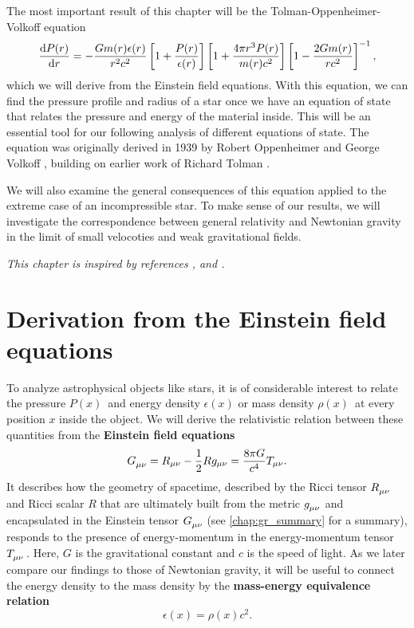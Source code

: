 The most important result of this chapter will be the Tolman-Oppenheimer-Volkoff equation
\begin{equation*}
	\odv{P(r)}{r} = -\frac{G m(r) \epsilon(r)}{r^2 c^2} \left[ 1 + \frac{P(r)}{\epsilon(r)} \right] \left[ 1 + \frac{4 \pi r^3 P(r)}{m(r) c^2} \right] \left[ 1 - \frac{2 G m(r)}{r c^2} \right]^{-1} ,
\end{equation*}
which we will derive from the Einstein field equations.
With this equation, we can find the pressure profile and radius of a star once we have an equation of state that relates the pressure and energy of the material inside.
This will be an essential tool for our following analysis of different equations of state.
The equation was originally derived in 1939 by Robert Oppenheimer and George Volkoff \cite{ref:tov}, building on earlier work of Richard Tolman \cite{ref:tolman}.

We will also examine the general consequences of this equation applied to the extreme case of an incompressible star. 
To make sense of our results, we will investigate the correspondence between general relativity and Newtonian gravity in the limit of small velocoties and weak gravitational fields.

\textit{This chapter is inspired by references \cite{ref:carroll}, \cite{ref:mtw} and \cite{ref:mika_gr_notes}.}

\section{Derivation from the Einstein field equations}
\label{sec:einstein_to_tov}

To analyze astrophysical objects like stars, it is of considerable interest to relate the pressure $P(x)$ and energy density $\epsilon(x)$ or mass density $\rho(x)$ at every position $x$ inside the object.
We will derive the relativistic relation between these quantities from the \textbf{Einstein field equations} \cite[equation 4.44]{ref:carroll}
\begin{equation}
	G\indices{_\mu_\nu} = R_{\mu \nu} - \frac{1}{2} R g_{\mu \nu} = \frac{8 \pi G}{c^4} T_{\mu \nu} .
	\label{eq:einstein}
\end{equation}
It describes how the geometry of spacetime, described by the Ricci tensor $R\indices{_\mu_\nu}$ and Ricci scalar $R$ that are ultimately built from the metric $g\indices{_\mu_\nu}$ and encapsulated in the Einstein tensor $G\indices{_\mu_\nu}$ (see \cref{chap:gr_summary} for a summary), responds to the presence of energy-momentum in the energy-momentum tensor $T\indices{_\mu_\nu}$.
Here, $G$ is the gravitational constant and $c$ is the speed of light.
As we later compare our findings to those of Newtonian gravity, it will be useful to connect the energy density to the mass density by the \textbf{mass-energy equivalence relation}
\begin{equation}
	\epsilon(x) = \rho(x) c^2 .
	\label{eq:tov:mass_energy_equivalence}
\end{equation}

